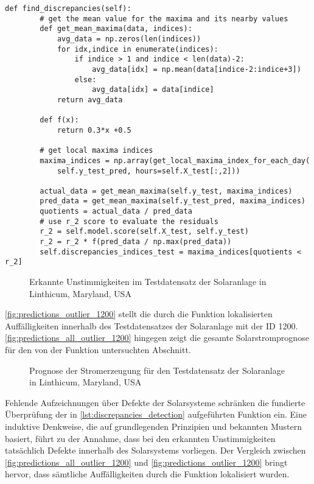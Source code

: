 \documentclass[12pt, a4paper]{article}
\begin{document}
\begin{lstlisting}[basicstyle=\small,label={lst:discrepancies_detection}, caption={Funktion zur Erkennung von Ausreißern}]
def find_discrepancies(self):
        # get the mean value for the maxima and its nearby values
        def get_mean_maxima(data, indices):
            avg_data = np.zeros(len(indices))
            for idx,indice in enumerate(indices):
                if indice > 1 and indice < len(data)-2:
                    avg_data[idx] = np.mean(data[indice-2:indice+3])
                else:
                    avg_data[idx] = data[indice]
            return avg_data
        
        def f(x):
            return 0.3*x +0.5
        
        # get local maxima indices
        maxima_indices = np.array(get_local_maxima_index_for_each_day(
            self.y_test_pred, hours=self.X_test[:,2]))
        
        actual_data = get_mean_maxima(self.y_test, maxima_indices)
        pred_data = get_mean_maxima(self.y_test_pred, maxima_indices)
        quotients = actual_data / pred_data
        # use r_2 score to evaluate the residuals
        r_2 = self.model.score(self.X_test, self.y_test)
        r_2 = r_2 * f(pred_data / np.max(pred_data))
        self.discrepancies_indices_test = maxima_indices[quotients < r_2]        
\end{lstlisting}

\begin{figure}[H]
\centering
\def\svgwidth{400pt}

\caption{Erkannte Unstimmigkeiten im Testdatensatz der Solaranlage in Linthicum, Maryland, USA}
\label{fig:predictions_outlier_1200}
\end{figure}

\autoref{fig:predictions_outlier_1200} stellt die durch die Funktion lokalisierten Auffälligkeiten innerhalb des Testdatensatzes der Solaranlage mit der ID 1200. \autoref{fig:predictions_all_outlier_1200} hingegen zeigt die gesamte Solarstromprognose für den von der Funktion untersuchten Abschnitt. 

\begin{figure}[H]
\centering
\def\svgwidth{400pt}

\caption{Prognose der Stromerzeugung für den Testdatensatz der Solaranlage in Linthicum, Maryland, USA}
\label{fig:predictions_all_outlier_1200}
\end{figure}

Fehlende Aufzeichnungen über Defekte der Solarsysteme schränken die fundierte Überprüfung der in \autoref{lst:discrepancies_detection} aufgeführten Funktion ein. Eine induktive Denkweise, die auf grundlegenden Prinzipien und bekannten Mustern basiert, führt zu der Annahme, dass bei den erkannten Unstimmigkeiten tatsächlich Defekte innerhalb des Solarsystems vorliegen. Der Vergleich zwischen \autoref{fig:predictions_all_outlier_1200} und \autoref{fig:predictions_outlier_1200} bringt hervor, dass sämtliche Auffälligkeiten durch die Funktion lokalisiert wurden.
\end{document}
